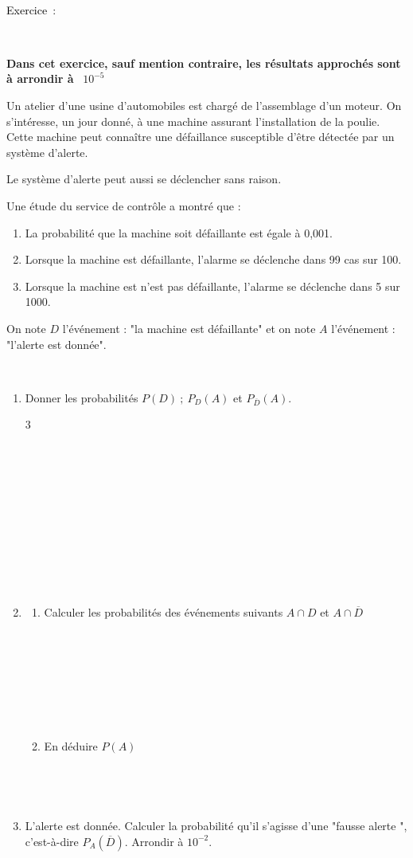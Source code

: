\documentclass[11pt,a4paper]{article}
\newcounter{numexos}%
\newcommand{\exercice}[1]{%
\addtocounter{numexos}{1}%
\textcolor{black}{\normalsize Exercice\,\thenumexos\,}\,#1%
}
\newcommand{\bex}[2]
{\begin{bclogo}[couleur = white,logo= , barre=none,  arrondi = 0.1]
{~\exercice:~~{#1}}
~~
{#2}
~~
\end{bclogo}}
\newcommand{\cadre}[1]
{\begin{bclogo}[couleur = white,logo=,  arrondi = 0.1,barre=none]
~~
{%
\rule{0mm}{#1mm}}\par
\medskip
~~
\end{bclogo}}
\begin{document}
   \newpage



\bex{}{
\begin{center}
\textbf{Dans cet exercice, sauf mention contraire, les résultats approchés sont à arrondir à}~ \boldmath  $10^{-5}$\unboldmath \end{center}

Un atelier d'une usine d'automobiles est chargé de l'assemblage d'un moteur. 
On s'intéresse, un jour donné, à une machine assurant l'installation de la poulie. Cette machine peut connaître une défaillance susceptible d'être détectée par un système d'alerte. 

Le système d'alerte peut aussi se déclencher sans raison. 

Une étude du service de contrôle a montré que :
\begin{enumerate}
\item[\textbullet] La probabilité que la machine soit défaillante est égale à 0,001.
\item[\textbullet] Lorsque la machine est défaillante, l'alarme se déclenche dans 99 cas sur 100.
\item[\textbullet] Lorsque la machine est n'est pas défaillante, l'alarme se déclenche dans 5 sur 1000.
\end{enumerate} 

On note $D$ l'événement : "la machine est défaillante" et on note $A$ l'événement : "l'alerte est donnée". }

\begin{enumerate}
\item  Donner les probabilités $P(D) ~;~ P_{D}(A)$ et $P_{\overline{D}}(A)$.

\begin{multicols}{3}
	\cadre{5}
	\cadre{5}
	\cadre{5}
\end{multicols}

\item \begin{enumerate}
\item Calculer les probabilités des événements suivants $A \cap D$ et $A \cap \overline{D}$\\
\vspace{-1mm}

\cadre{1}
\cadre{1}
\item En déduire $P(A)$\\
\vspace{-1mm}
\cadre{1}
\end{enumerate}
\item   L'alerte est donnée. Calculer la probabilité qu'il s'agisse d'une "fausse alerte ", c'est-à-dire $P_A(\overline{D})$. Arrondir à $10^{-2}$.

\cadre{10}
\end{enumerate}
\end{document}
